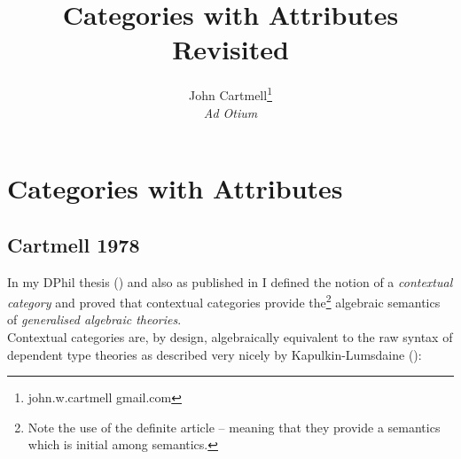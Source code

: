 \documentclass[10pt,a4paper]{article}
\title{Categories with Attributes Revisited}
\author{John Cartmell\footnote{john.w.cartmell gmail.com}\\ \normalsize{\textit{Ad Otium}}}
\renewcommand{\erpictureFolder}[0]{../SharedPictures}
\begin{document}
\maketitle

\section{Categories with Attributes}

\scalebox{0.6}{

}

\subsection{Cartmell 1978}

In my DPhil thesis (\cite{Cartmell78}) and also as published in \cite{Cartmell86}
I defined the notion of a \textit{contextual category} and proved that contextual
categories provide the\footnote{Note the use of the definite article -- meaning that they provide a semantics which is initial among semantics.} algebraic semantics of \textit{generalised algebraic theories}. \\

\noindent 
Contextual categories are, by design,  algebraically equivalent to the raw syntax of dependent type theories as described very nicely by Kapulkin-Lumsdaine (\cite{kapulkinlumsdaine2012}): \\
\end{document}
